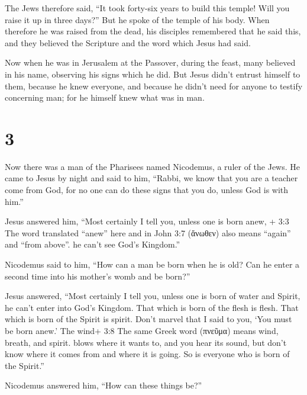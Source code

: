  The Jews therefore said, ``It took forty-six years to
build this temple! Will you raise it up in three days?'' 
But he spoke of the temple of his body.  When therefore he
was raised from the dead, his disciples remembered that he said this,
and they believed the Scripture and the word which Jesus had said.

 Now when he was in Jerusalem at the Passover, during the
feast, many believed in his name, observing his signs which he did.
 But Jesus didn't entrust himself to them, because he knew
everyone,  and because he didn't need for anyone to testify
concerning man; for he himself knew what was in man.

\hypertarget{section-2}{%
\section{3}\label{section-2}}

 Now there was a man of the Pharisees named Nicodemus, a
ruler of the Jews.  He came to Jesus by night and said to
him, ``Rabbi, we know that you are a teacher come from God, for no one
can do these signs that you do, unless God is with him.''

 Jesus answered him, ``Most certainly I tell you, unless one
is born anew, + 3:3 The word translated ``anew'' here and in John 3:7
(ἄνωθεν) also means ``again'' and ``from above''. he can't see God's
Kingdom.''

 Nicodemus said to him, ``How can a man be born when he is
old? Can he enter a second time into his mother's womb and be born?''

 Jesus answered, ``Most certainly I tell you, unless one is
born of water and Spirit, he can't enter into God's Kingdom.
 That which is born of the flesh is flesh. That which is
born of the Spirit is spirit.  Don't marvel that I said to
you, `You must be born anew.'  The wind+ 3:8 The same Greek
word (πνεῦμα) means wind, breath, and spirit. blows where it wants to,
and you hear its sound, but don't know where it comes from and where it
is going. So is everyone who is born of the Spirit.''

 Nicodemus answered him, ``How can these things be?''

